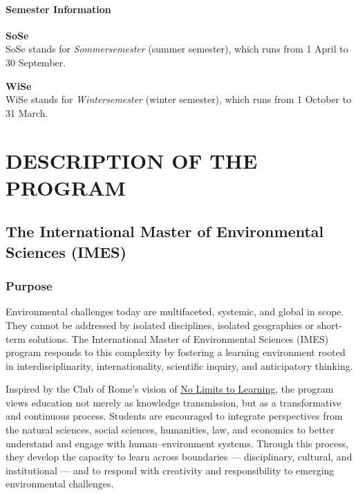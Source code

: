 \documentclass[
  letterpaper,
  10pt,
  openany]{book}
\begin{document}
\subsection*{Semester Information}\label{semester-information}

\textbf{SoSe}\\
SoSe stands for \emph{Sommersemester} (summer semester), which runs from
1 April to 30 September.

\textbf{WiSe}\\
WiSe stands for \emph{Wintersemester} (winter semester), which runs from
1 October to 31 March.

\part{DESCRIPTION OF THE PROGRAM}

\chapter*{The International Master of Environmental Sciences
(IMES)}\label{the-international-master-of-environmental-sciences-imes}


\section*{Purpose}\label{purpose}


Environmental challenges today are multifaceted, systemic, and global in
scope. They cannot be addressed by isolated disciplines, isolated
geographies or short-term solutions. The International Master of
Environmental Sciences (IMES) program responds to this complexity by
fostering a learning environment rooted in interdisciplinarity,
internationality, scientific inquiry, and anticipatory thinking.

Inspired by the Club of Rome's vision of
\href{https://www.clubofrome.org/blog-post/bologna-qa-legacy-of-no-limits-to-learning/}{No
Limits to Learning}, the program views education not merely as knowledge
transmission, but as a transformative and continuous process. Students
are encouraged to integrate perspectives from the natural sciences,
social sciences, humanities, law, and economics to better understand and
engage with human--environment systems. Through this process, they
develop the capacity to learn across boundaries --- disciplinary,
cultural, and institutional --- and to respond with creativity and
responsibility to emerging environmental challenges.
\end{document}

